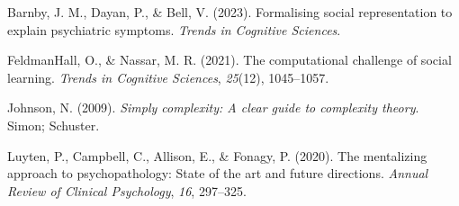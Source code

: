 \documentclass[10pt, letterpaper]{article}
\newlength{\cslhangindent}
\newlength{\cslentryspacingunit} %
\newenvironment{CSLReferences}[2] %
{%
	\setlength{\parindent}{0pt}
	\ifodd #1
	\let\oldpar\par
	\def\par{\hangindent=\cslhangindent\oldpar}
	\fi
}%
{}
\begin{document}
\hypertarget{refs}{}
\begin{CSLReferences}{1}{0}
\leavevmode{}%
Barnby, J. M., Dayan, P., \& Bell, V. (2023). Formalising social
representation to explain psychiatric symptoms. \emph{Trends in
Cognitive Sciences}.

\leavevmode{}%
FeldmanHall, O., \& Nassar, M. R. (2021). The computational challenge of
social learning. \emph{Trends in Cognitive Sciences}, \emph{25}(12),
1045--1057.

\leavevmode{}%
Johnson, N. (2009). \emph{Simply complexity: A clear guide to complexity
theory}. Simon; Schuster.

\leavevmode{}%
Luyten, P., Campbell, C., Allison, E., \& Fonagy, P. (2020). The
mentalizing approach to psychopathology: State of the art and future
directions. \emph{Annual Review of Clinical Psychology}, \emph{16},
297--325.

\end{CSLReferences}


\end{document}
